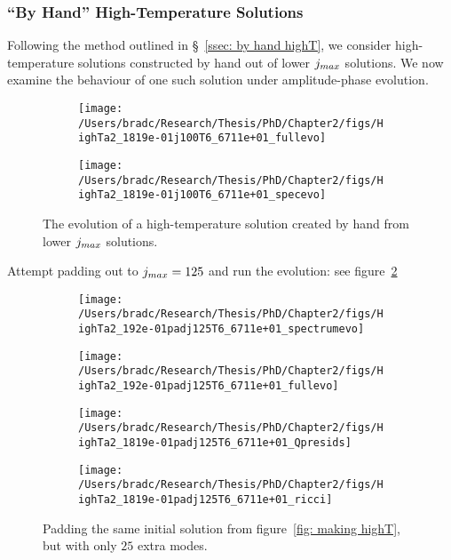 \documentclass[../PhD.tex]{subfiles}
\begin{document}

\subsubsection{``By Hand'' High-Temperature Solutions}

Following the method outlined in \S~\!\ref{ssec: by hand highT}, we consider high-temperature solutions constructed by hand out of lower $j_{max}$ solutions. We now examine the behaviour of one such solution under amplitude-phase evolution. 

\begin{figure}[h!]
	\centering
	\begin{subfigure}[t]{0.45\textwidth}
		\texttt{[image: /Users/bradc/Research/Thesis/PhD/Chapter2/figs/HighTa2\_1819e-01j100T6\_6711e+01\_fullevo]}
	\end{subfigure}
	\;
	\begin{subfigure}[t]{0.45\textwidth}
		\texttt{[image: /Users/bradc/Research/Thesis/PhD/Chapter2/figs/HighTa2\_1819e-01j100T6\_6711e+01\_specevo]}
	\end{subfigure}
	\caption{The evolution of a high-temperature solution created by hand from lower $j_{max}$ solutions.}
	\label{fig: HighTa2_1819e-01j100T6_6711e+01}
\end{figure}

Attempt padding out to $j_{max} = 125$ and run the evolution: see figure~\ref{fig:HighTa2_1819e-01padj125T6_6711e+01_evo}

\begin{figure}[h]
	\centering
	\begin{subfigure}[t]{0.45\textwidth}
		\texttt{[image: /Users/bradc/Research/Thesis/PhD/Chapter2/figs/HighTa2\_192e-01padj125T6\_6711e+01\_spectrumevo]}
	\end{subfigure}
	\;
	\begin{subfigure}[t]{0.45\textwidth}
		\texttt{[image: /Users/bradc/Research/Thesis/PhD/Chapter2/figs/HighTa2\_192e-01padj125T6\_6711e+01\_fullevo]}
	\end{subfigure}
	\;
	\begin{subfigure}[t]{0.45\textwidth}
		\texttt{[image: /Users/bradc/Research/Thesis/PhD/Chapter2/figs/HighTa2\_1819e-01padj125T6\_6711e+01\_Qpresids]}
	\end{subfigure}
	\;
	\begin{subfigure}[t]{0.45\textwidth}
		\texttt{[image: /Users/bradc/Research/Thesis/PhD/Chapter2/figs/HighTa2\_1819e-01padj125T6\_6711e+01\_ricci]}
	\end{subfigure}
	\caption{Padding the same initial solution from figure~\ref{fig: making highT}, but with only $25$ extra modes.}
	\label{fig:HighTa2_1819e-01padj125T6_6711e+01_evo}
\end{figure}
\end{document}
